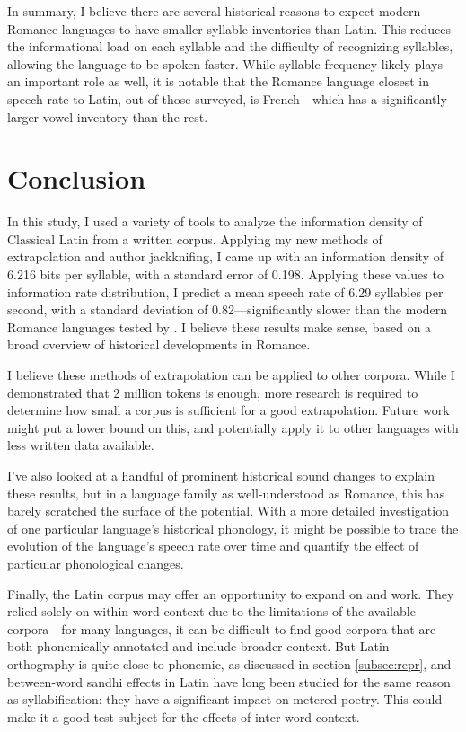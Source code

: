 \documentclass[12pt,twoside]{article}
\begin{document}
In summary, I believe there are several historical reasons to expect modern Romance languages to have smaller syllable inventories than Latin. This reduces the informational load on each syllable and the difficulty of recognizing syllables, allowing the language to be spoken faster. While syllable frequency likely plays an important role as well, it is notable that the Romance language closest in speech rate to Latin, out of those surveyed, is French---which has a significantly larger vowel inventory than the rest.

\section{Conclusion}
\label{sec:concl}

In this study, I used a variety of tools to analyze the information density of Classical Latin from a written corpus. Applying my new methods of extrapolation and author jackknifing, I came up with an information density of 6.216 bits per syllable, with a standard error of 0.198. Applying these values to  information rate distribution, I predict a mean speech rate of 6.29 syllables per second, with a standard deviation of 0.82---significantly slower than the modern Romance languages tested by \citeauthor{coupé}. I believe these results make sense, based on a broad overview of historical developments in Romance.

I believe these methods of extrapolation can be applied to other corpora. While I demonstrated that 2 million tokens is enough, more research is required to determine how small a corpus is sufficient for a good extrapolation. Future work might put a lower bound on this, and potentially apply it to other languages with less written data available.

I've also looked at a handful of prominent historical sound changes to explain these results, but in a language family as well-understood as Romance, this has barely scratched the surface of the potential. With a more detailed investigation of one particular language's historical phonology, it might be possible to trace the evolution of the language's speech rate over time and quantify the effect of particular phonological changes.

Finally, the Latin corpus may offer an opportunity to expand on \citet{oh} and  work. They relied solely on within-word context due to the limitations of the available corpora---for many languages, it can be difficult to find good corpora that are both phonemically annotated and include broader context. But Latin orthography is quite close to phonemic, as discussed in section \ref{subsec:repr}, and between-word sandhi effects in Latin have long been studied for the same reason as syllabification: they have a significant impact on metered poetry. This could make it a good test subject for the effects of inter-word context.
\end{document}
